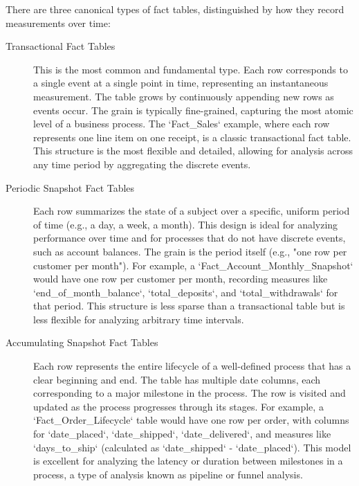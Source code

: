There are three canonical types of fact tables, distinguished by how they record measurements over time:
\begin{description}
    \item[Transactional Fact Tables] This is the most common and fundamental type. Each row corresponds to a single event at a single point in time, representing an instantaneous measurement. The table grows by continuously appending new rows as events occur. The grain is typically fine-grained, capturing the most atomic level of a business process. The `Fact\_Sales` example, where each row represents one line item on one receipt, is a classic transactional fact table. This structure is the most flexible and detailed, allowing for analysis across any time period by aggregating the discrete events.

    \item[Periodic Snapshot Fact Tables] Each row summarizes the state of a subject over a specific, uniform period of time (e.g., a day, a week, a month). This design is ideal for analyzing performance over time and for processes that do not have discrete events, such as account balances. The grain is the period itself (e.g., "one row per customer per month"). For example, a `Fact\_Account\_Monthly\_Snapshot` would have one row per customer per month, recording measures like `end\_of\_month\_balance`, `total\_deposits`, and `total\_withdrawals` for that period. This structure is less sparse than a transactional table but is less flexible for analyzing arbitrary time intervals.

    \item[Accumulating Snapshot Fact Tables] Each row represents the entire lifecycle of a well-defined process that has a clear beginning and end. The table has multiple date columns, each corresponding to a major milestone in the process. The row is visited and updated as the process progresses through its stages. For example, a `Fact\_Order\_Lifecycle` table would have one row per order, with columns for `date\_placed`, `date\_shipped`, `date\_delivered`, and measures like `days\_to\_ship` (calculated as `date\_shipped` - `date\_placed`). This model is excellent for analyzing the latency or duration between milestones in a process, a type of analysis known as pipeline or funnel analysis.
\end{description}

